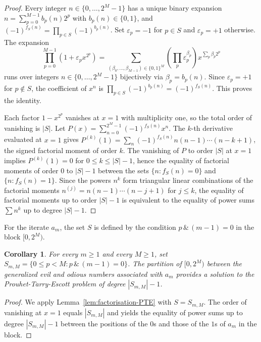 \documentclass[12pt,reqno]{article}
\theoremstyle{plain}
\newtheorem{corollary}[theorem]{Corollary}
\theoremstyle{definition}
\begin{document}
\begin{proof}
Every integer $n \in \{0,\dots,2^M-1\}$ has a unique binary expansion $n = \sum_{p=0}^{M-1} b_p(n) 2^p$ with $b_p(n) \in \{0,1\}$, and $(-1)^{f_S(n)} = \prod_{p \in S} (-1)^{b_p(n)}$. Set $\varepsilon_p = -1$ for $p \in S$ and $\varepsilon_p = +1$ otherwise. The expansion
\[
  \prod_{p=0}^{M-1} (1 + \varepsilon_p x^{2^p}) = \sum_{(\beta_0,\dots,\beta_{M-1}) \in \{0,1\}^M} \left(\prod_{p} \varepsilon_p^{\beta_p}\right) x^{\sum_p \beta_p 2^p}
\]
runs over integers $n \in \{0,\dots,2^M-1\}$ bijectively via $\beta_p = b_p(n)$. Since $\varepsilon_p = +1$ for $p \notin S$, the coefficient of $x^n$ is $\prod_{p \in S} (-1)^{b_p(n)} = (-1)^{f_S(n)}$. This proves the identity.

Each factor $1 - x^{2^p}$ vanishes at $x=1$ with multiplicity one, so the total order of vanishing is $|S|$. Let $P(x) = \sum_{n=0}^{2^M-1} (-1)^{f_S(n)} x^n$. The $k$-th derivative evaluated at $x = 1$ gives $P^{(k)}(1) = \sum_{n} (-1)^{f_S(n)} n(n-1)\cdots(n-k+1)$, the signed factorial moment of order $k$. The vanishing of $P$ to order $|S|$ at $x = 1$ implies $P^{(k)}(1) = 0$ for $0 \le k \le |S|-1$, hence the equality of factorial moments of order $0$ to $|S|-1$ between the sets $\{n : f_S(n) = 0\}$ and $\{n : f_S(n) = 1\}$. Since the powers $n^k$ form triangular linear combinations of the factorial moments $n^{(j)} = n(n-1)\cdots(n-j+1)$ for $j \le k$, the equality of factorial moments up to order $|S|-1$ is equivalent to the equality of power sums $\sum n^k$ up to degree $|S|-1$.
\end{proof}

For the iterate $a_m$, the set $S$ is defined by the condition $p\,\&\,(m-1)=0$ in the block $[0, 2^M)$.

\begin{corollary}
\label{cor:PTE-am}
For every $m \ge 1$ and every $M \ge 1$, set $S_{m,M} = \{0 \le p < M : p\,\&\,(m-1) = 0\}$. The partition of $[0, 2^M)$ between the generalized evil and odious numbers associated with $a_m$ provides a solution to the Prouhet-Tarry-Escott problem of degree $|S_{m,M}| - 1$.
\end{corollary}

\begin{proof}
We apply Lemma~\ref{lem:factorisation-PTE} with $S = S_{m,M}$. The order of vanishing at $x = 1$ equals $|S_{m,M}|$ and yields the equality of power sums up to degree $|S_{m,M}| - 1$ between the positions of the $0$s and those of the $1$s of $a_m$ in the block.
\end{proof}
\end{document}
